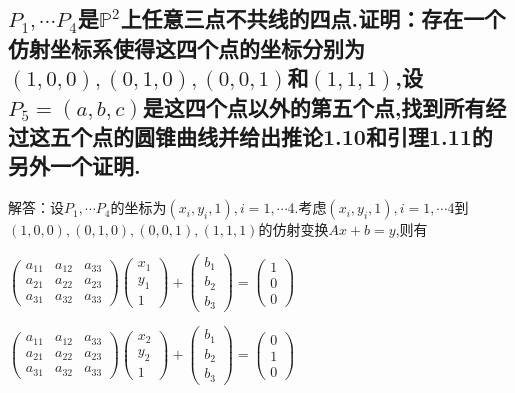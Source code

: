 \documentclass[UTF8]{book}
\begin{document}
		\subsection{$ P_{1},\cdots P_{4} $是$ \mathbb{P}^{2} $上任意三点不共线的四点.证明：存在一个仿射坐标系使得这四个点的坐标分别为$ (1,0,0),(0,1,0),(0,0,1) $和$ (1,1,1) $,设$ P_{5} = (a,b,c)$是这四个点以外的第五个点,找到所有经过这五个点的圆锥曲线并给出推论1.10和引理1.11的另外一个证明.}
		
			解答：设$ P_{1},\cdots P_{4} $的坐标为$ (x_{i},y_{i},1) ,i = 1,\cdots 4$.考虑$ (x_{i},y_{i},1) ,i = 1,\cdots 4$到$ (1,0,0),(0,1,0),(0,0,1),(1,1,1) $的仿射变换$ Ax +b = y $,则有
			
			
			$\left(\begin{array}{lll}{a_{11}} & {a_{12}} & {a_{33}} \\ {a_{21}} & {a_{22}} & {a_{23}} \\ {a_{31}} & {a_{32}} & {a_{33}}\end{array}\right)\left(\begin{array}{l}{x_{1}} \\ {y_{1}} \\ 1\end{array}\right)+\left(\begin{array}{l}{b_{1}} \\ {b_{2}} \\ {b_{3}}\end{array}\right)=\left(\begin{array}{c}{1} \\ {0} \\ {0}\end{array}\right)$
			
			
			$\left(\begin{array}{lll}{a_{11}} & {a_{12}} & {a_{33}} \\ {a_{21}} & {a_{22}} & {a_{23}} \\ {a_{31}} & {a_{32}} & {a_{33}}\end{array}\right)\left(\begin{array}{l}{x_{2}} \\ {y_{2}} \\ 1\end{array}\right)+\left(\begin{array}{l}{b_{1}} \\ {b_{2}} \\ {b_{3}}\end{array}\right)=\left(\begin{array}{c}{0} \\ {1} \\ {0}\end{array}\right)$
			
\end{document}
